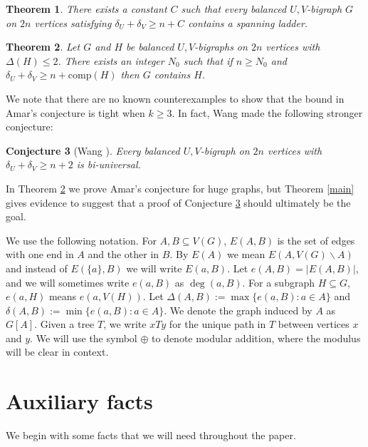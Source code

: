 \documentclass[oneside,12pt]{memoir}
\newtheorem{theorem}{Theorem}[section]
\newtheorem{conjecture}[theorem]{Conjecture}
\newcommand{\ssm}{\smallsetminus}
\begin{document}
\begin{theorem}\label{mainconstant}There exists a constant $C$ such
that every balanced $U,V$-bigraph $G$ on $2n$ vertices satisfying
$\delta_{U}+\delta_{V}\geq n+C$ contains a spanning ladder.
\end{theorem}

\begin{theorem}\label{amarlarge} Let $G$ and $H$ be balanced $U,V$-bigraphs
on $2n$ vertices with $\Delta(H)\le2$. There exists an integer $N_{0}$
such that if $n\geq N_{0}$ and $\delta_{U}+\delta_{V}\geq n+\mathrm{comp}(H)$
then $G$ contains $H$. 
\end{theorem}

We note that there are no known counterexamples to show that the bound in Amar's conjecture is tight when $k\geq 3$.  In fact, Wang made the following stronger conjecture:
\begin{conjecture}[Wang \cite{W2}]
\label{con:Wang2}
Every balanced $U,V$-bigraph on $2n$ vertices with $\delta_U+\delta_V\geq n+2$ is bi-universal.
\end{conjecture}

In Theorem \ref{amarlarge} we prove Amar's conjecture for huge graphs, but Theorem \ref{main} gives evidence to suggest that a proof of Conjecture \ref{con:Wang2} should ultimately be the goal.

We use the following notation. 
For $A,B\subseteq V(G)$, $E(A,B)$ is the set of edges with one end in $A$ and the other in $B$. By $E(A)$ we mean $E(A,V(G)\ssm A)$ and instead of $E(\{a\},B)$ we will write $E(a,B)$. Let $e(A,B)=|E(A,B)|$, and we will sometimes write $e(a,B)$ as $\deg(a,B)$. For a subgraph $H\subseteq G$, $e(a,H)$ means $e(a,V(H))$.
Let $\Delta(A,B):=\max\{e(a,B):a\in A\}$ and $\delta(A,B):=\min\{e(a,B):a\in A\}$. We denote the graph induced by $A$ as $G[A]$. Given a tree $T$, we write $xTy$ for the unique path in $T$ between vertices $x$ and $y$.  We will use the symbol $\oplus$ to denote modular addition, where the modulus will be clear in context.


\section{Auxiliary facts}

We begin with some facts that we will need throughout the paper.
\end{document}
